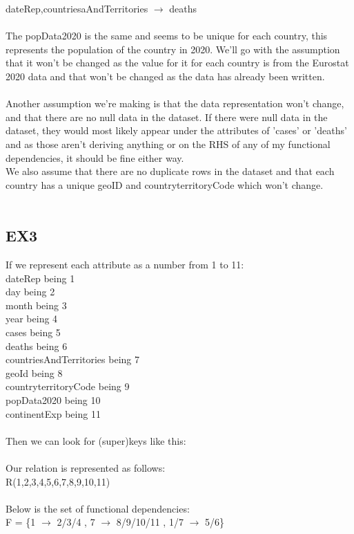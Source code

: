 \documentclass[]{article}
\begin{document}
dateRep,countriesaAndTerritories $\rightarrow$ deaths\\
\\The popData2020 is the same and seems to be unique for each country, this represents the population of the country in 2020. We'll go with the assumption that it won't be changed as the value for it for each country is from the Eurostat 2020 data and that won't be changed as the data has already been written.\\\\
Another assumption we're making is that the data representation won't change, and that there are no null data in the dataset. If there were null data in the dataset, they would most likely appear under the attributes of 'cases' or 'deaths' and as those aren't deriving anything or on the RHS of any of my functional dependencies, it should be fine either way.\\
We also assume that there are no duplicate rows in the dataset and that each country has a unique geoID and countryterritoryCode which won't change.\\\\
\pagebreak

\subsection{EX3}
If we represent each attribute as a number from 1 to 11:\\
dateRep being 1\\
day being 2\\
month being 3\\
year being 4\\
cases being 5\\
deaths being 6\\
countriesAndTerritories being 7\\
geoId being 8\\
countryterritoryCode being 9\\
popData2020 being 10\\
continentExp being 11\\
\\Then we can look for (super)keys like this:\\\\
Our relation is represented as follows:\\
R(1,2,3,4,5,6,7,8,9,10,11)\\
\\Below is the set of functional dependencies:\\
F = \{1 $\rightarrow$ 2/3/4 , 7 $\rightarrow$ 8/9/10/11 , 1/7 $\rightarrow$ 5/6\}\\
\end{document}
